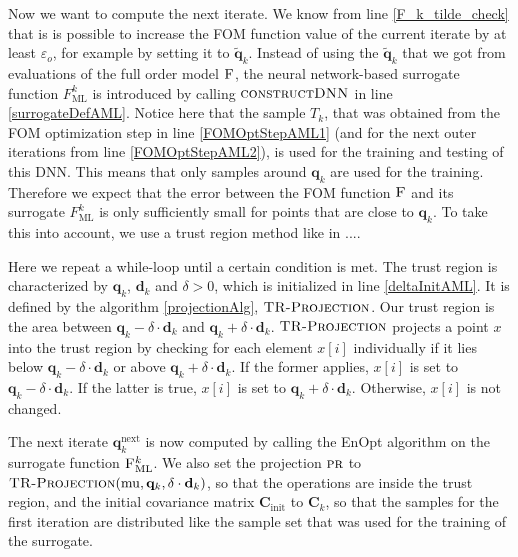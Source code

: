 Now we want to compute the next iterate. We know from line \ref{F_k_tilde_check} that is is possible to increase the FOM function value of the current iterate by at least $\varepsilon_o$, for example by setting it to $\tilde{\mathbf{q}}_k$. Instead of using the $\tilde{\mathbf{q}}_k$ that we got from evaluations of the full order model $\textproc{F}$, the neural network-based surrogate function $F_\mathrm{ML}^k$ is introduced by calling $\textproc{constructDNN}$ in line \ref{surrogateDefAML}. Notice here that the sample $T_k$, that was obtained from the FOM optimization step in line \ref{FOMOptStepAML1} (and for the next outer iterations from line \ref{FOMOptStepAML2}), is used for the training and testing of this DNN. This means that only samples around $\mathbf{q}_k$ are used for the training. Therefore we expect that the error between the FOM function $\textproc{F}$ and its surrogate $F_\mathrm{ML}^k$ is only sufficiently small for points that are close to $\mathbf{q}_k$. To take this into account, we use a trust region method like in ....

Here we repeat a while-loop until a certain condition is met. The trust region is characterized by $\mathbf{q}_k$, $\mathbf{d}_k$ and $\delta>0$, which is initialized in line \ref{deltaInitAML}. It is defined by the algorithm \ref{projectionAlg}, $\textproc{TR-Projection}$. Our trust region is the area between $\mathbf{q}_k-\delta\cdot\mathbf{d}_k$ and $\mathbf{q}_k+\delta\cdot\mathbf{d}_k$. $\textproc{TR-Projection}$ projects a point $x$ into the trust region by checking for each element $x[i]$ individually if it lies below $\mathbf{q}_k-\delta\cdot\mathbf{d}_k$ or above $\mathbf{q}_k+\delta\cdot\mathbf{d}_k$. If the former applies, $x[i]$ is set to $\mathbf{q}_k-\delta\cdot\mathbf{d}_k$. If the latter is true, $x[i]$ is set to $\mathbf{q}_k+\delta\cdot\mathbf{d}_k$. Otherwise, $x[i]$ is not changed.

The next iterate $\mathbf{q}^\mathrm{next}_k$ is now computed by calling the EnOpt algorithm on the surrogate function $\textproc{F$_\mathrm{ML}^k$}$. We also set the projection $\textproc{pr}$ to $\Call{TR-Projection}{\mathrm{mu}, \mathbf{q}_k, \delta\cdot\mathbf{d}_k}$, so that the operations are inside the trust region, and the initial covariance matrix $\mathbf{C}_\mathrm{init}$ to $\mathbf{C}_k$, so that the samples for the first iteration are distributed like the sample set that was used for the training of the surrogate.

